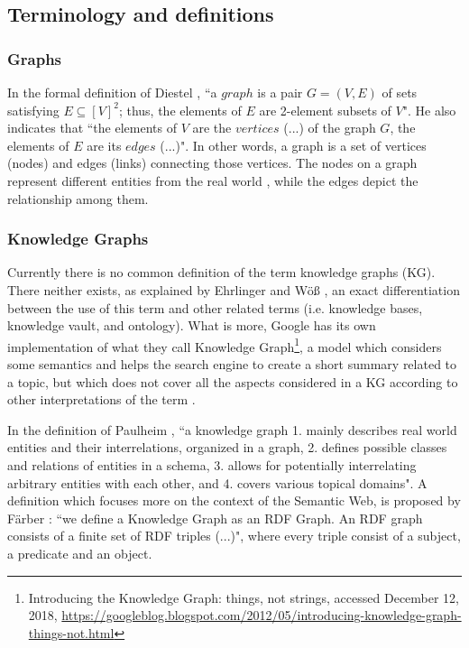 \documentclass[runningheads]{llncs}
\begin{document}
\subsection{Terminology and definitions} \label{terminology}

\subsubsection{Graphs} \label{graphs}
In the formal definition of Diestel \cite{Diestel}, ``a $graph$ is a pair $G = (V, E)$ of sets satisfying $E \subseteq [V]^2$; thus, the elements of $E$ are 2-element subsets of $V$". He also indicates that ``the elements of $V$ are the $vertices$ (...) of the graph $G$, the elements of $E$ are its $edges$ (...)". In other words, a graph is a set of vertices (nodes) and edges (links) connecting those vertices. The nodes on a graph represent different entities from the real world \cite{Robinson}, while the edges depict the relationship among them.

\subsubsection{Knowledge Graphs} \label{knowledge-graphs}
Currently there is no common definition of the term knowledge graphs
(KG). There neither exists, as explained by Ehrlinger and W{\"o}{\ss}
\cite{Ehrlinger}, an exact differentiation between the use of this term and other related terms (i.e. knowledge bases, knowledge vault, and
ontology). What is more, Google has its own implementation of what they
call Knowledge Graph\footnote{Introducing the Knowledge Graph: things, not strings, accessed December 12, 2018, \href{https://googleblog.blogspot.com/2012/05/introducing-knowledge-graph-things-not.html}
{https://googleblog.blogspot.com/2012/05/introducing-knowledge-graph-things-not.html}}, 
a model which considers some semantics and helps the search engine to create a short summary related to a topic, but which does not cover all
the aspects considered in a KG according to other interpretations of
the term \cite{Ehrlinger}.

In the definition of Paulheim \cite{Paulheim}, ``a knowledge graph
1. mainly describes real world entities and their interrelations, organized in a graph, 2. defines possible classes and relations of entities in a schema, 3. allows for potentially interrelating arbitrary entities with each other, and 4. covers various topical domains". A definition which focuses more on the context of the Semantic Web, is proposed by F{\"a}rber \cite{Farber}: ``we define a Knowledge Graph as an RDF Graph. An RDF graph consists of a finite set of RDF triples (...)", where every triple consist of a subject, a predicate and an object.
\end{document}
